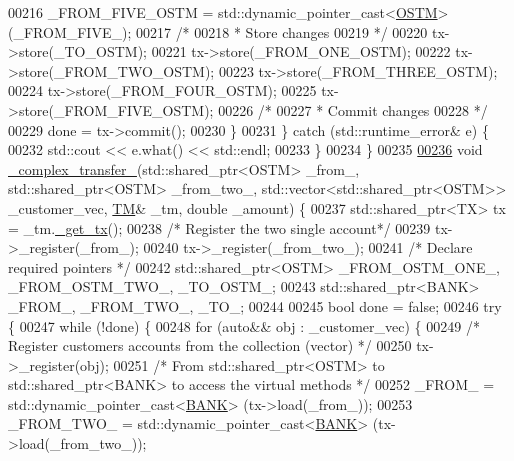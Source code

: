 \begin{DoxyCode}
00216             \_FROM\_FIVE\_OSTM = std::dynamic\_pointer\_cast<\hyperlink{class_o_s_t_m}{OSTM}> (\_FROM\_FIVE\_);
00217             \textcolor{comment}{/*}
00218 \textcolor{comment}{             * Store changes}
00219 \textcolor{comment}{             */}
00220             tx->store(\_TO\_OSTM);
00221             tx->store(\_FROM\_ONE\_OSTM);
00222             tx->store(\_FROM\_TWO\_OSTM);
00223             tx->store(\_FROM\_THREE\_OSTM);
00224             tx->store(\_FROM\_FOUR\_OSTM);
00225             tx->store(\_FROM\_FIVE\_OSTM);
00226             \textcolor{comment}{/*}
00227 \textcolor{comment}{             * Commit changes}
00228 \textcolor{comment}{             */}
00229             done = tx->commit();
00230         \}
00231     \} \textcolor{keywordflow}{catch} (std::runtime\_error& e) \{
00232         std::cout << e.what() << std::endl;
00233     \}
00234 \}
00235 
\hypertarget{client_8h_source.tex_l00236}{}\hyperlink{classclient_a3c5e378b6df49d2d2eea4a073da5a594_a3c5e378b6df49d2d2eea4a073da5a594}{00236} \textcolor{keywordtype}{void} \hyperlink{classclient_a3c5e378b6df49d2d2eea4a073da5a594_a3c5e378b6df49d2d2eea4a073da5a594}{\_complex\_transfer\_}(std::shared\_ptr<OSTM> \_from\_, std::shared\_ptr<OSTM> \_from\_two\_, 
      std::vector<std::shared\_ptr<OSTM>> \_customer\_vec, \hyperlink{class_t_m}{TM}& \_tm, \textcolor{keywordtype}{double} \_amount) \{
00237     std::shared\_ptr<TX> tx = \_tm.\hyperlink{class_t_m_a41cb0226cc4080c931651b13f74a0075_a41cb0226cc4080c931651b13f74a0075}{\_get\_tx}();
00238     \textcolor{comment}{/* Register the two single account*/}
00239     tx->\_register(\_from\_);
00240     tx->\_register(\_from\_two\_);
00241     \textcolor{comment}{/* Declare required pointers */}
00242     std::shared\_ptr<OSTM> \_FROM\_OSTM\_ONE\_, \_FROM\_OSTM\_TWO\_, \_TO\_OSTM\_;
00243     std::shared\_ptr<BANK> \_FROM\_, \_FROM\_TWO\_, \_TO\_;
00244 
00245     \textcolor{keywordtype}{bool} done = \textcolor{keyword}{false};
00246     \textcolor{keywordflow}{try} \{
00247         \textcolor{keywordflow}{while} (!done) \{
00248             \textcolor{keywordflow}{for} (\textcolor{keyword}{auto}&& obj : \_customer\_vec) \{
00249                 \textcolor{comment}{/* Register customers accounts from the collection (vector) */}
00250                 tx->\_register(obj);
00251                 \textcolor{comment}{/* From std::shared\_ptr<OSTM> to std::shared\_ptr<BANK> to access the virtual methods  */}
00252                 \_FROM\_ = std::dynamic\_pointer\_cast<\hyperlink{class_b_a_n_k}{BANK}> (tx->load(\_from\_));
00253                 \_FROM\_TWO\_ = std::dynamic\_pointer\_cast<\hyperlink{class_b_a_n_k}{BANK}> (tx->load(\_from\_two\_));

\end{DoxyCode}
